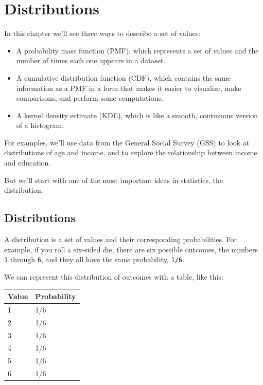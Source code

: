 \hypertarget{distributions}{%
\chapter{Distributions}\label{distributions}}

In this chapter we'll see three ways to describe a set of values:

\begin{itemize}
\item
  A probability mass function (PMF), which represents a set of values
  and the number of times each one appears in a dataset.
\item
  A cumulative distribution function (CDF), which contains the same
  information as a PMF in a form that makes it easier to visualize, make
  comparisons, and perform some computations.
\item
  A kernel density estimate (KDE), which is like a smooth, continuous
  version of a histogram.
\end{itemize}

For examples, we'll use data from the General Social Survey (GSS) to
look at distributions of age and income, and to explore the relationship
between income and education.

But we'll start with one of the most important ideas in statistics, the
distribution.

\hypertarget{distributions-1}{%
\section{Distributions}\label{distributions-1}}

A distribution is a set of values and their corresponding probabilities.
For example, if you roll a six-sided die, there are six possible
outcomes, the numbers \passthrough{\lstinline!1!} through
\passthrough{\lstinline!6!}, and they all have the same probability,
\passthrough{\lstinline!1/6!}.

We can represent this distribution of outcomes with a table, like this:

\begin{longtable}[]{@{}ll@{}}
\midrule()
Value & Probability \\
\midrule()
\endhead
1 & 1/6 \\
2 & 1/6 \\
3 & 1/6 \\
4 & 1/6 \\
5 & 1/6 \\
6 & 1/6 \\
\midrule()
\end{longtable}

